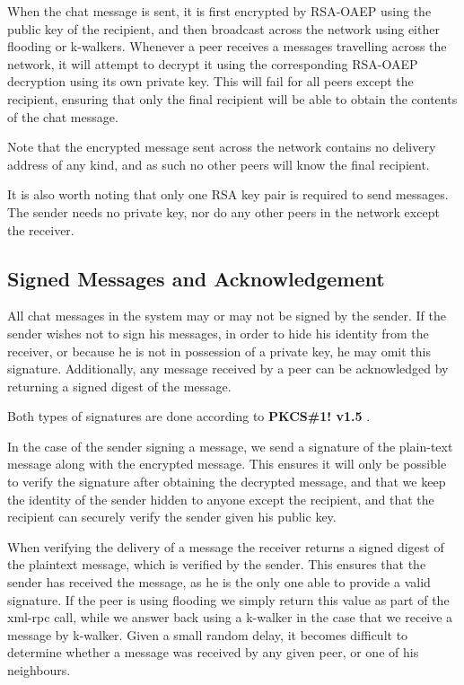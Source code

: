 When the chat message is sent, it is first encrypted by RSA-OAEP using the public key of the recipient, and then broadcast across the network using either flooding or k-walkers. Whenever a peer receives a messages travelling across the network, it will attempt to decrypt it using the corresponding RSA-OAEP decryption using its own private key. This will fail for all peers except the recipient, ensuring that only the final recipient will be able to obtain the contents of the chat message.

Note that the encrypted message sent across the network contains no delivery address of any kind, and as such no other peers will know the final recipient.

It is also worth noting that only one RSA key pair is required to send messages. The sender needs no private key, nor do any other peers in the network except the receiver.

\subsection{Signed Messages and Acknowledgement}

All chat messages in the system may or may not be signed by the sender. If the sender wishes not to sign his messages, in order to hide his identity from the receiver, or because he is not in possession of a private key, he may omit this signature. Additionally, any message received by a peer can be acknowledged by returning a signed digest of the message.

Both types of signatures are done according to \textbf{PKCS\#1! v1.5} \citep{PKCS}.

In the case of the sender signing a message, we send a signature of the plain-text message along with the encrypted message. This ensures it will only be possible to verify the signature after obtaining the decrypted message, and that we keep the identity of the sender hidden to anyone except the recipient, and that the recipient can securely verify the sender given his public key.

When verifying the delivery of a message the receiver returns a signed digest of the plaintext message, which is verified by the sender. This ensures that the sender has received the message, as he is the only one able to provide a valid signature. If the peer is using flooding we simply return this value as part of the xml-rpc call, while we answer back using a k-walker in the case that we receive a message by k-walker. Given a small random delay, it becomes difficult to determine whether a message was received by any given peer, or one of his neighbours. 


